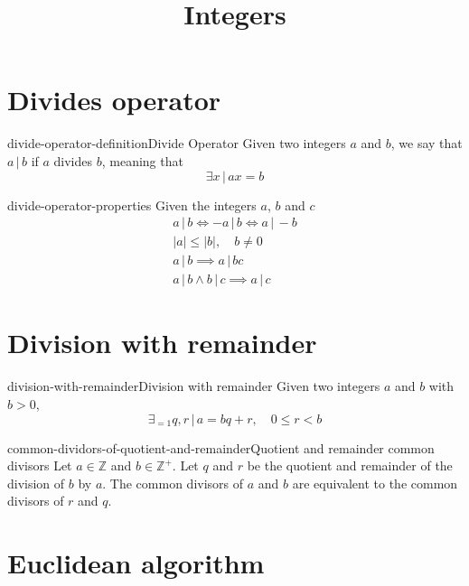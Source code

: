 \documentclass[preview]{standalone}
\newcommand{\divides}{\,|\,}
\begin{document}
\title{Integers}
\genpage

\section{Divides operator}

\begin{snippetdefinition}{divide-operator-definition}{Divide Operator}{
    Given two integers \(a\) and \(b\),
    we say that \(a \divides b\) if \(a\) divides \(b\),
    meaning that
    \[
        \exists x \,|\, ax = b
    \]
}
\end{snippetdefinition}

\begin{snippet}{divide-operator-properties}
Given the integers \(a\), \(b\) and \(c\)
\begin{align*}
    a \divides b \iff -a \divides b \iff a \divides -b \\
    |a| \leq |b|, \quad b \neq 0 \\
    a \divides b \implies a \divides bc \\
    a \divides b \land b \divides c \implies a \divides c
\end{align*}
\end{snippet}

\section{Division with remainder}

\begin{snippetproposition}{division-with-remainder}{Division with remainder}{
    Given two integers \(a\) and \(b\) with \(b > 0\),
    \[
        \exists_{=1} q,r \,|\, a=bq+r, \quad 0 \leq r < b
    \]
}
\end{snippetproposition}


\begin{snippetlemma}{common-dividors-of-quotient-and-remainder}{Quotient and remainder common divisors}
Let \(a \in \mathbb{Z}\) and \(b \in {\mathbb{Z}}^+\).
Let \(q\) and \(r\) be the quotient and remainder of the division of \(b\)
by \(a\).
The common divisors of \(a\) and \(b\) are equivalent to the common divisors of \(r\) and \(q\).
\end{snippetlemma}


\section{Euclidean algorithm}
\end{document}
